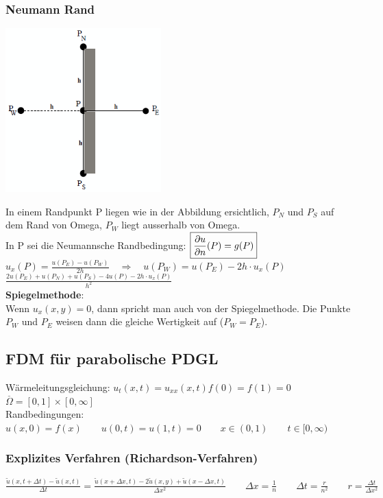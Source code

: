 \subsubsection{Neumann Rand 
}
\begin{minipage}{6cm}
	\includegraphics[width=6cm]{Content/Numerik/NeumannRand.png}


\end{minipage}
\hfill
\begin{minipage}{13cm}
In einem Randpunkt P liegen wie in der Abbildung ersichtlich, $P_N$ und $P_S$ auf dem Rand von Omega, $P_W$ liegt ausserhalb von Omega.\\
In P sei die Neumannsche Randbedingung: $\boxed{\frac{\partial u}{\partial n}(P)=g(P)}$\\
$u_x(P)=\frac{u(P_E)-u(P_W)}{2h}\quad\Rightarrow\quad u(P_W)=u(P_E)-2h\cdot u_x(P)$\\

$\boxed{\frac{2u(P_E) + u(P_N) +
u(P_S)- 4 u(P) - 2h\cdot u_x(P)}{h^2}}$\\


\textbf{Spiegelmethode}:\\
Wenn $u_x(x,y) = 0$, dann spricht man auch von der Spiegelmethode. Die Punkte $P_W$ und $P_E$ weisen dann die gleiche Wertigkeit auf ($P_W=P_E$).
\end{minipage}


\subsection{FDM für parabolische PDGL}
	Wärmeleitungsgleichung: $\boxed{u_t(x,t)=u_{xx}(x,t)}$\qquad $f(0)=f(1)=0$ \qquad$ \overset{\_}{\Omega}=[0,1]\times [0,\infty]$\\
	
	Randbedingungen: $u(x,0)=f(x) \qquad u(0,t)=u(1,t)=0\qquad x\in(0,1) \qquad t\in[0,\infty)$
\subsubsection{Explizites Verfahren (Richardson-Verfahren)}
$\boxed{\frac{\tilde{u}(x,t+\Delta t) - \tilde{u}(x,t)}{\Delta t} = 
\frac{\tilde{u}(x+\Delta x, t)-2\tilde{u}(x,y) + \tilde{u}( x - \Delta x, t )} {\Delta x^2}} \qquad \Delta x=\frac 1n\qquad \Delta t=\frac r{n^2} \qquad \boxed{r=\frac{\Delta
t}{\Delta x^2}}$\\

